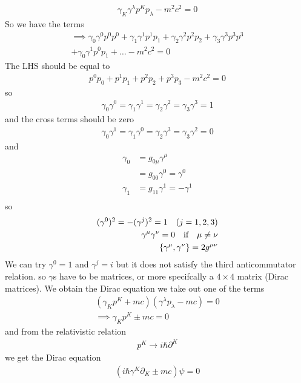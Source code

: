 \documentclass[../main.tex]{subfiles}
\begin{document}
\begin{align*}
    \gamma_K \gamma^\lambda p^K p_\lambda - m^2 c^2 = 0
\end{align*}
So we have the terms
\begin{align*}
    \implies \gamma_0 \gamma^0 p^0 p^0 + \gamma_1 \gamma^1 p^1 p_1 
    + \gamma_2 \gamma^2 p^2 p_2 + \gamma_3 \gamma^3 p^3 p^3  \\
    + \gamma_0 \gamma^1 p^0 p_1 + \dots - m^2 c^2 = 0
\end{align*}
The LHS should be equal to
\begin{align*}
    p^0 p_0 + p^1 p_1 + p^2 p_2 + p^3 p_3 - m^2 c^2 = 0
\end{align*}
so
\begin{align*}
    \gamma_0 \gamma^0 = \gamma_1 \gamma^1 = \gamma_2 \gamma^2 = \gamma_3 \gamma^3 = 1
\end{align*}
and the cross terms should be zero
\begin{align*}
    \gamma_0 \gamma^1 = \gamma_1 \gamma^0 = \gamma_2 \gamma^3 = \gamma_3 \gamma^2 = 0   
\end{align*}
and
\begin{align*}
    \gamma_0 &= g_{0\mu} \gamma^\mu \\
        &= g_{00} \gamma^0 = \gamma^0 \\
    \gamma_1 &= g_{11} \gamma^1 = -\gamma^1 \\
\end{align*}
so 
\begin{align*}
    (\gamma^0)^2 = - (\gamma^j)^2 = 1 \quad (j = 1,2,3) \\
    \gamma^\mu \gamma^\nu = 0 \qqtext{if} \mu \neq \nu \\
    \{ \gamma^\mu, \gamma^\nu \} = 2g^{\mu\nu}
\end{align*}
We can try $\gamma^0 = 1$ and $\gamma^j = i$ but it does not satisfy the third anticommutator relation.
so $\gamma$s have to be matrices, or more specifcally a $4\times 4$ matrix (Dirac matrices). We 
obtain the Dirac equation we take out one of the terms
\begin{align*}
    (\gamma_K p^K + mc)(\gamma^\lambda p_\lambda - mc) = 0\\
    \implies \gamma_K p^K \pm mc = 0
\end{align*}
and from the relativistic relation
\begin{align*}
    p^K \to i\hbar \partial^K
\end{align*}
we get the Dirac equation
\begin{align*}
    (i\hbar \gamma^K \partial_K \pm mc) \psi = 0
\end{align*}
\end{document}
